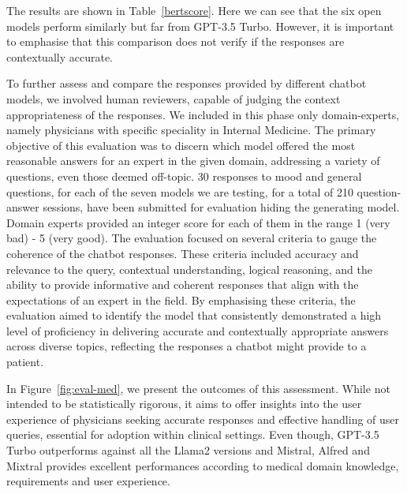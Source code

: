 The results are shown in Table~\ref{bertscore}.
% 
Here we can see that the six open models perform similarly but far from GPT-3.5 Turbo.
%
However, it is important to emphasise that this comparison does not verify if the responses are contextually accurate. 

To further assess and compare the responses provided by different chatbot models, we involved human reviewers, capable of judging the context appropriateness of the responses.
%
We included in this phase only domain-experts, namely physicians with specific speciality in Internal Medicine.
%
The primary objective of this evaluation was to discern which model offered the most reasonable answers for an expert in the given domain, addressing a variety of questions, even those deemed off-topic. 
%
30 responses to mood and general questions, for each of the seven models we are testing, for a total of 210 question-answer sessions, have been submitted for evaluation hiding the generating model. Domain experts provided an integer score for each of them in the range 1 (very bad) - 5 (very good).
%
The evaluation focused on several criteria to gauge the coherence of the chatbot responses. These criteria included accuracy and relevance to the query, contextual understanding, logical reasoning, and the ability to provide informative and coherent responses that align with the expectations of an expert in the field. 
%
By emphasising these criteria, the evaluation aimed to identify the model that consistently demonstrated a high level of proficiency in delivering accurate and contextually appropriate answers across diverse topics, reflecting the responses a chatbot might provide to a patient.

%
In Figure~\ref{fig:eval-med}, we present the outcomes of this assessment. While not intended to be statistically rigorous, it aims to offer insights into the user experience of physicians seeking accurate responses and effective handling of user queries, essential for adoption within clinical settings.
%
Even though, GPT-3.5 Turbo outperforms against all the Llama2 versions and Mistral, Alfred and Mixtral provides excellent performances according to medical domain knowledge, requirements and user experience.
 
 



